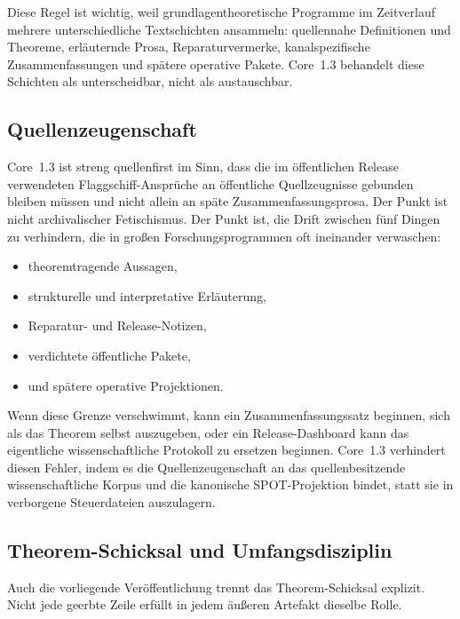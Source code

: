 Diese Regel ist wichtig, weil grundlagentheoretische Programme im Zeitverlauf
mehrere unterschiedliche Textschichten ansammeln: quellennahe Definitionen und
Theoreme, erläuternde Prosa, Reparaturvermerke, kanalspezifische
Zusammenfassungen und spätere operative Pakete. Core~1.3 behandelt diese
Schichten als unterscheidbar, nicht als austauschbar.

\subsection{Quellenzeugenschaft}

Core~1.3 ist streng quellenfirst im Sinn, dass die im öffentlichen Release
verwendeten Flaggschiff-Ansprüche an öffentliche Quellzeugnisse gebunden
bleiben müssen und nicht allein an späte Zusammenfassungsprosa. Der Punkt ist
nicht archivalischer Fetischismus. Der Punkt ist, die Drift zwischen fünf
Dingen zu verhindern, die in großen Forschungsprogrammen oft ineinander
verwaschen:

\begin{itemize}
\item theoremtragende Aussagen,
\item strukturelle und interpretative Erläuterung,
\item Reparatur- und Release-Notizen,
\item verdichtete öffentliche Pakete,
\item und spätere operative Projektionen.
\end{itemize}

Wenn diese Grenze verschwimmt, kann ein Zusammenfassungssatz beginnen, sich als
das Theorem selbst auszugeben, oder ein Release-Dashboard kann das eigentliche
wissenschaftliche Protokoll zu ersetzen beginnen. Core~1.3 verhindert diesen
Fehler, indem es die Quellenzeugenschaft an das quellenbesitzende
wissenschaftliche Korpus und die kanonische SPOT-Projektion bindet, statt sie
in verborgene Steuerdateien auszulagern.

\subsection{Theorem-Schicksal und Umfangsdisziplin}

Auch die vorliegende Veröffentlichung trennt das Theorem-Schicksal explizit.
Nicht jede geerbte Zeile erfüllt in jedem äußeren Artefakt dieselbe Rolle.


